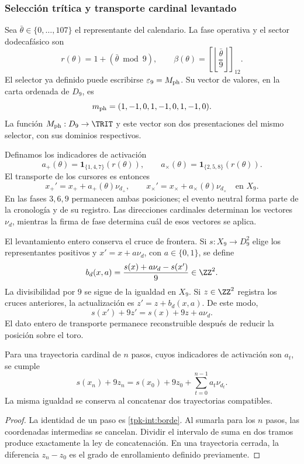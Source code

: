 \subsubsection{Selección trítica y transporte cardinal levantado}
\label{tpk-int:seleccion}

Sea \(\bar\theta\in\{0,\ldots,107\}\) el representante del calendario.
La fase operativa y el sector dodecafásico son
\begin{equation}
 r(\theta)=1+(\bar\theta\bmod9),\qquad
 \beta(\theta)=\left[\left\lfloor\frac{\bar\theta}{9}\right\rfloor\right]_{12}.
 \label{tpk-int:fase}
\end{equation}
El selector ya definido puede escribirse \(\varepsilon_9=M_{\rm ph}\).
Su vector de valores, en la carta ordenada de \(D_9\), es
\[
 m_{\rm ph}=(1,-1,0,1,-1,0,1,-1,0).
\]
La función \(M_{\rm ph}:D_9\to\TRIT\) y este vector son dos
presentaciones del mismo selector, con sus dominios respectivos.

Definamos los indicadores de activación
\[
 a_+(\theta)=\mathbf1_{\{1,4,7\}}(r(\theta)),\qquad
 a_\times(\theta)=\mathbf1_{\{2,5,8\}}(r(\theta)).
\]
El transporte de los cursores es entonces
\begin{equation}
 x_+'=x_++a_+(\theta)\nu_{d_+},\qquad
 x_\times'=x_\times+a_\times(\theta)\nu_{d_\times}
 \quad\text{en }X_9.
 \label{tpk-int:cursores}
\end{equation}
En las fases \(3,6,9\) permanecen ambas posiciones; el evento neutral
forma parte de la cronología y de su registro. Las direcciones cardinales
determinan los vectores \(\nu_d\), mientras la firma de fase determina
cuál de esos vectores se aplica.

El levantamiento entero conserva el cruce de frontera. Si
\(s:X_9\to D_9^2\) elige los representantes positivos y
\(x'=x+a\nu_d\), con \(a\in\{0,1\}\), se define
\begin{equation}
 b_d(x,a)=\frac{s(x)+a\nu_d-s(x')}{9}\in\ZZ^2.
 \label{tpk-int:borde}
\end{equation}
La divisibilidad por \(9\) se sigue de la igualdad en \(X_9\).
Si \(z\in\ZZ^2\) registra los cruces anteriores, la actualización es
\(z'=z+b_d(x,a)\). De este modo,
\[
 s(x')+9z'=s(x)+9z+a\nu_d.
\]
El dato entero de transporte permanece reconstruible después de reducir
la posición sobre el toro.

\begin{proposition}
\label{tpk-int:prop-desplazamiento}
Para una trayectoria cardinal de \(n\) pasos, cuyos indicadores de
activación son \(a_t\), se cumple
\[
 s(x_n)+9z_n=s(x_0)+9z_0+
 \sum_{t=0}^{n-1}a_t\nu_{d_t}.
\]
La misma igualdad se conserva al concatenar dos trayectorias compatibles.
\end{proposition}
\begin{proof}
La identidad de un paso es \eqref{tpk-int:borde}. Al sumarla para los
\(n\) pasos, las coordenadas intermedias se cancelan. Dividir el intervalo
de suma en dos tramos produce exactamente la ley de concatenación. En una
trayectoria cerrada, la diferencia \(z_n-z_0\) es el grado de
enrollamiento definido previamente.
\end{proof}

